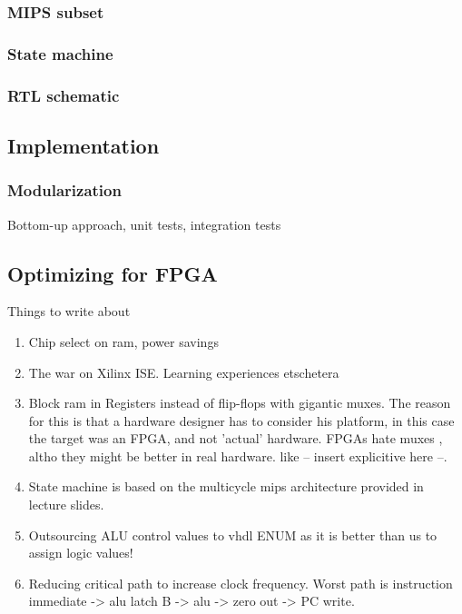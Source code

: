 \subsubsection{MIPS subset}

\subsubsection{State machine}

\subsubsection{RTL schematic}

\subsection{Implementation}

\subsubsection{Modularization}

Bottom-up approach, unit tests, integration tests

\subsection{Optimizing for FPGA}


Things to write about

\begin{enumerate}
  \item
    Chip select on ram, power savings

  \item
    The war on Xilinx ISE. Learning experiences etschetera

  \item
    Block ram in Registers instead of flip-flops with gigantic muxes. The reason for this is that a hardware designer has to consider his platform, in this case the target was an FPGA, and not 'actual' hardware. FPGAs hate muxes , altho they might be better in real hardware. like -- insert explicitive here --.

  \item
    State machine is based on the multicycle mips architecture provided in lecture slides.

  \item
    Outsourcing ALU control values to vhdl ENUM as it is better than us to assign logic values!

  \item
    Reducing critical path to increase clock frequency. Worst path is instruction immediate -> alu latch B -> alu -> zero out -> PC write.


\end{enumerate}
